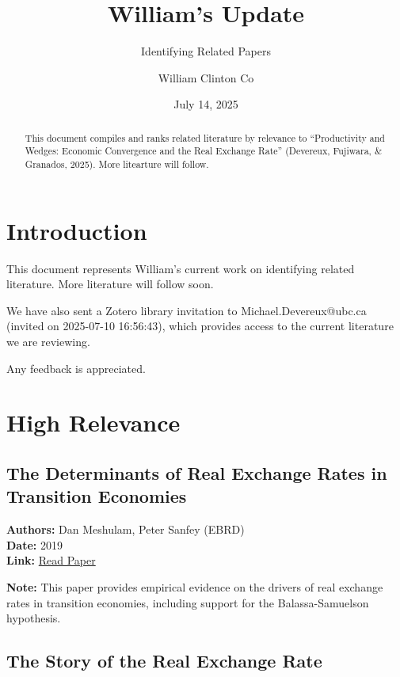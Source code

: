 \documentclass[
  11pt,
]{article}
\title{William's Update}
\subtitle{Identifying Related Papers}
\author{William Clinton Co}
\date{July 14, 2025}
\renewcommand*\contentsname{Table of contents}
\newcommand\contentsname{Table of contents}
\begin{document}
\maketitle
\begin{abstract}
This document compiles and ranks related literature by relevance to
``Productivity and Wedges: Economic Convergence and the Real Exchange
Rate'' (Devereux, Fujiwara, \& Granados, 2025). More litearture will
follow.
\end{abstract}

\renewcommand*\contentsname{Table of contents}
{
\hypersetup{linkcolor=}
\setcounter{tocdepth}{3}
\tableofcontents
}

\section{Introduction}\label{introduction}

This document represents William's current work on identifying related
literature. More literature will follow soon.

We have also sent a Zotero library invitation to Michael.Devereux@ubc.ca
(invited on 2025-07-10 16:56:43), which provides access to the current
literature we are reviewing.

Any feedback is appreciated.

\section{High Relevance}\label{high-relevance}

\subsection{The Determinants of Real Exchange Rates in Transition
Economies}\label{the-determinants-of-real-exchange-rates-in-transition-economies}

\textbf{Authors:} Dan Meshulam, Peter Sanfey (EBRD)\\
\textbf{Date:} 2019\\
\textbf{Link:}
\href{https://drive.google.com/file/d/1MldCJB2yPD3AEI93kt9qSX11rjcTdySo/view?usp=sharing}{Read
Paper}

\textbf{Note:} This paper provides empirical evidence on the drivers of
real exchange rates in transition economies, including support for the
Balassa-Samuelson hypothesis.

\subsection{The Story of the Real Exchange
Rate}\label{the-story-of-the-real-exchange-rate}
\end{document}
